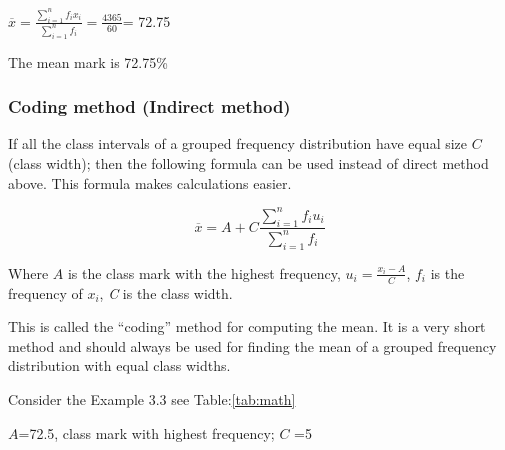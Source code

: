 \documentclass[
]{book}
\begin{document}
\(\overline{x} = \frac{\sum_{i = 1}^{n}{f_{i}x_{i}}}{\sum_{i = 1}^{n}f_{i}} = \frac{4365}{60}\)=
72.75

The mean mark is 72.75\%

\hypertarget{coding-method-indirect-method}{%
\subsubsection{Coding method (Indirect method)}\label{coding-method-indirect-method}}

If all the class intervals of a grouped frequency distribution have
equal size \(C\) (class width); then the following formula can be used
instead of direct method above. This formula makes calculations easier.

\[\overline{x} = A + C\frac{\sum_{i = 1}^{n}{f_{i}u_{i}}}{\sum_{i = 1}^{n}f_{i}}\]

Where \(A\) is the class mark with the highest frequency,
\(u_{i} = \frac{x_{i} - A}{C}\), \(f_{i}\) is the frequency of \(x_{i}\), \emph{C}
is the class width.

This is called the ``coding'' method for computing the mean. It is a very
short method and should always be used for finding the mean of a grouped
frequency distribution with equal class widths.

Consider the Example 3.3 see Table:\ref{tab:math}

\(A\)=72.5, class mark with highest frequency; \(C\) =5
\end{document}
